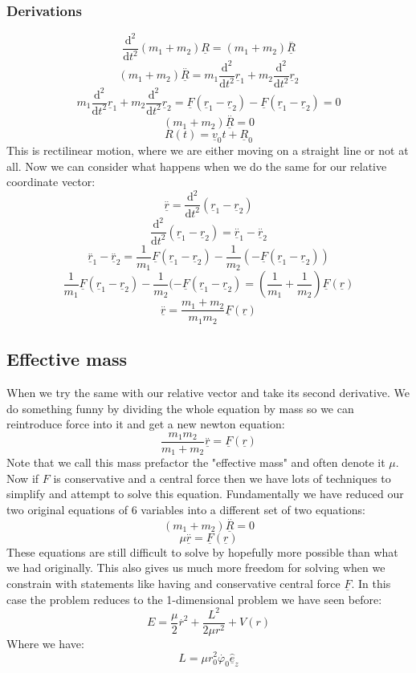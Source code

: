 \documentclass[12pt]{article}
\newcommand{\uvec}[1]{\underline{\hat{#1}}}
\newcommand{\bvec}[1]{\uvec{e}_#1}
\newcommand{\df}[2]{\frac{\text{d}#1}{\text{d}#2}}
\begin{document}
\subsubsection*{Derivations}
\[\df{^2}{t^2}(m_1+m_2)\underline{R}=(m_1+m_2)\overset{..}{\underline{R}}\]
\[(m_1+m_2)\overset{..}{\underline{R}}=m_1\df{^2}{t^2}\underline{r}_1+m_2\df{^2}{t^2}\underline{r}_2\]
\[m_1\df{^2}{t^2}\underline{r}_1+m_2\df{^2}{t^2}\underline{r}_2=\underline{F}(\underline{r}_1-\underline{r}_2)-\underline{F}(\underline{r}_1-\underline{r}_2)=0\]
\[(m_1+m_2)\overset{..}{\underline{R}}=0\]
\[R(t)=\underline{v}_0t+\underline{R}_0\]
This is rectilinear motion, where we are either moving on a straight line or not at all. Now we can consider what happens when we do the same for our relative coordinate vector:
\[\overset{..}{\underline{r}}=\df{^2}{t^2}(\underline{r}_1-\underline{r}_2)\]
\[\df{^2}{t^2}(\underline{r}_1-\underline{r}_2)=\overset{..}{\underline{r}}_1-\overset{..}{\underline{r}}_2\]
\[\overset{..}{\underline{r}}_1-\overset{..}{\underline{r}}_2=\frac{1}{m_1}\underline{F}(\underline{r}_1-\underline{r}_2)-\frac{1}{m_2}(-\underline{F}(\underline{r}_1-\underline{r}_2))\]
\[\frac{1}{m_1}\underline{F}(\underline{r}_1-\underline{r}_2)-\frac{1}{m_2}(-\underline{F}(\underline{r}_1-\underline{r}_2)=\left(\frac{1}{m_1}+\frac{1}{m_2}\right)\underline{F}(\underline{r})\]
\[\overset{..}{\underline{r}}=\frac{m_1+m_2}{m_1m_2}\underline{F}(\underline{r})\]
\subsection*{Effective mass}
When we try the same with our relative vector and take its second derivative. We do something funny by dividing the whole equation by mass so we can reintroduce force into it and get a new newton equation:
\[\frac{m_1m_2}{m_1+m_2}\overset{..}{\underline{r}}=\underline{F}(\underline{r})\]
Note that we call this mass prefactor the "effective mass" and often denote it \(\mu\). Now if \(F\) is conservative and a central force then we have lots of techniques to simplify and attempt to solve this equation. Fundamentally we have reduced our two original equations of 6 variables into a different set of two equations:
\[(m_1+m_2)\overset{..}{\underline{R}}=0\]
\[\mu\overset{..}{\underline{r}}=\underline{F}(\underline{r})\]
These equations are still difficult to solve by hopefully more possible than what we had originally. This also gives us much more freedom for solving when we constrain with statements like having and conservative central force \(\underline{F}\). In this case the problem reduces to the 1-dimensional problem we have seen before:
\[E=\frac{\mu}{2}\overset{.}{r}^2+\frac{L^2}{2\mu r^2}+V(r)\]
Where we have:
\[L=\mu r_0^2\overset{.}{\varphi}_0\bvec{z}\]
\end{document}

